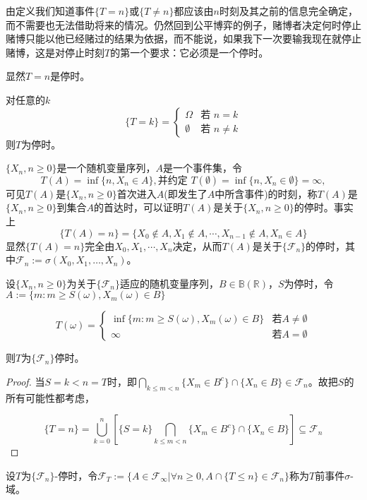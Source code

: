 \documentclass[lang=cn,10pt,thmcnt=section]{elegantbook}
\begin{document}
由定义我们知道事件$\{T = n\}$或$\{T \neq n\}$都应该由$n$时刻及其之前的信息完全确定，而不需要也无法借助将来的情况。仍然回到公平博弈的例子，赌博者决定何时停止赌博只能以他已经赌过的结果为依据，而不能说，如果我下一次要输我现在就停止赌博，这是对停止时刻$T$的第一个要求：它必须是一个停时。

显然$T = n$是停时。

对任意的$k$
\[
\{T = k\} = 
\begin{cases} 
\Omega & \text{若 } n = k \\
\emptyset & \text{若 } n \neq k 
\end{cases}
\]
则$T$为停时。

\begin{example}[首达时]
	$\{X_n, n \geq 0\}$是一个随机变量序列，$A$是一个事件集，令
\[
T(A) = \inf\{n, X_n \in A\}, \text{并约定 } T(\emptyset) = \inf\{n, X_n \in \emptyset\} = \infty,
\]
可见$T(A)$是$\{X_n, n \geq 0\}$首次进入$A$(即发生了$A$中所含事件)的时刻，称$T(A)$是$\{X_n, n \geq 0\}$到集合$A$的首达时，可以证明$T(A)$是关于$\{X_n, n \geq 0\}$的停时。事实上
\[
\{T(A) = n\} = \{X_0 \notin A, X_1 \notin A, \cdots, X_{n-1} \notin A, X_n \in A\}
\]
显然$\{T(A) = n\}$完全由$X_0, X_1, \cdots, X_n$决定，从而$T(A)$是关于$\{\mathcal{F}_n\}$的停时，其中$\mathcal{F}_n := \sigma(X_0, X_1, \ldots, X_n)$。
\end{example}
\begin{example}
	设$\{X_n, n \geq 0\}$为关于$\{\mathcal{F}_n\}$适应的随机变量序列，$B \in \mathbb{B}(\mathbb{R})$，$S$为停时，令$A := \{m: m \geq S(\omega), X_m(\omega) \in B\}$

\[
T(\omega) = 
\begin{cases} 
\inf\{m: m \geq S(\omega), X_m(\omega) \in B\} & \text{若} A \neq \emptyset \\
\infty & \text{若} A = \emptyset 
\end{cases}
\]

则$T$为$\{\mathcal{F}_n\}$停时。
\end{example}
\begin{proof}
	当$S = k < n = T$时，即$\bigcap\limits_{k \leq m < n} \{X_m \in B^c\} \cap \{X_n \in B\} \in \mathcal{F}_n$。故把$S$的所有可能性都考虑，

\[
\{T = n\} = \bigcup_{k=0}^{n} \left[ \{S = k\} \bigcap_{k \leq m < n} \{X_m \in B^c\} \cap \{X_n \in B\} \right] \subseteq \mathcal{F}_n
\]
\end{proof}
设$T$为$\{\mathcal{F}_n\}$-停时，令$\mathcal{F}_T := \{A \in \mathcal{F}_\infty | \forall n \geq 0, A \cap \{T \leq n\} \in \mathcal{F}_n\}$称为$T$前事件$\sigma$-域。
\end{document}

